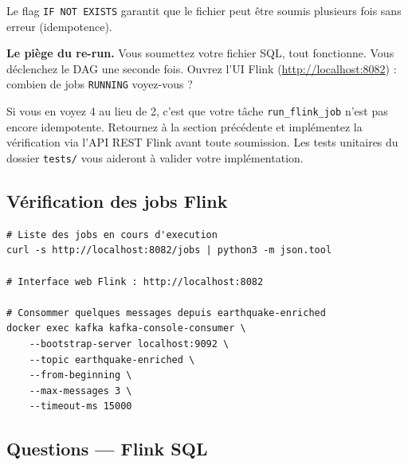 \documentclass[12pt,a4paper]{article}
\begin{document}
Le flag \texttt{IF NOT EXISTS} garantit que le fichier peut être soumis plusieurs fois
sans erreur (idempotence).

\begin{warningbox}
  \textbf{Le piège du re-run.}
  Vous soumettez votre fichier SQL, tout fonctionne. Vous déclenchez le DAG une seconde fois.
  Ouvrez l'UI Flink (\url{http://localhost:8082}) : combien de jobs \texttt{RUNNING} voyez-vous ?

  \medskip
  Si vous en voyez 4 au lieu de 2, c'est que votre tâche \texttt{run\_flink\_job}
  n'est pas encore idempotente. Retournez à la section précédente et implémentez
  la vérification via l'API REST Flink avant toute soumission.
  Les tests unitaires du dossier \texttt{tests/} vous aideront à valider votre implémentation.
\end{warningbox}

\subsection{Vérification des jobs Flink}

\begin{lstlisting}[style=bash, caption={Vérification des jobs via l'API REST Flink}]
# Liste des jobs en cours d'execution
curl -s http://localhost:8082/jobs | python3 -m json.tool

# Interface web Flink : http://localhost:8082

# Consommer quelques messages depuis earthquake-enriched
docker exec kafka kafka-console-consumer \
    --bootstrap-server localhost:9092 \
    --topic earthquake-enriched \
    --from-beginning \
    --max-messages 3 \
    --timeout-ms 15000
\end{lstlisting}

\subsection*{Questions --- Flink SQL}
\end{document}
